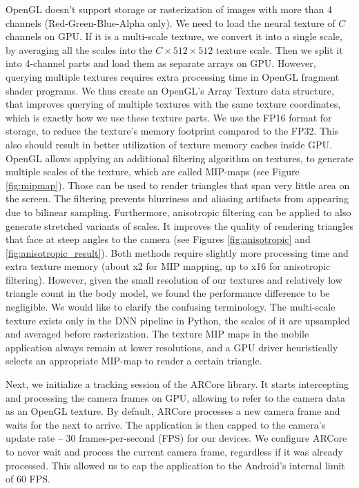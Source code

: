 OpenGL doesn't support storage or rasterization of images with more than 4 channels (Red-Green-Blue-Alpha only). We need to load the neural texture of $C$ channels on GPU. If it is a multi-scale texture, we convert it into a single scale, by averaging all the scales into the $C \times 512 \times 512$ texture scale. Then we split it into 4-channel parts and load them as separate arrays on GPU. However, querying multiple textures requires extra processing time in OpenGL fragment shader programs. We thus create an OpenGL's Array Texture data structure, that improves querying of multiple textures with the same texture coordinates, which is exactly how we use these texture parts. We use the FP16 format for storage, to reduce the texture's memory footprint compared to the FP32. This also should result in better utilization of texture memory caches inside GPU. OpenGL allows applying an additional filtering algorithm on textures, to generate multiple scales of the texture, which are called MIP-maps (see Figure \ref{fig:mipmap}). Those can be used to render triangles that span very little area on the screen. The filtering prevents blurriness and aliasing artifacts from appearing due to bilinear sampling. Furthermore, anisotropic filtering can be applied to also generate stretched variants of scales. It improves the quality of rendering triangles that face at steep angles to the camera (see Figures \ref{fig:anisotropic} and \ref{fig:anisotropic_result}). Both methods require slightly more processing time and extra texture memory (about x2 for MIP mapping, up to x16 for anisotropic filtering). However, given the small resolution of our textures and relatively low triangle count in the body model, we found the performance difference to be negligible. We would like to clarify the confusing terminology. The multi-scale texture exists only in the DNN pipeline in Python, the scales of it are upsampled and averaged before rasterization. The texture  MIP maps in the mobile application always remain at lower resolutions, and a GPU driver heuristically selects an appropriate MIP-map to render a certain triangle.

Next, we initialize a tracking session of the ARCore library. It starts intercepting and processing the camera frames on GPU, allowing to refer to the camera data as an OpenGL texture. By default, ARCore processes a new camera frame and waits for the next to arrive. The application is then capped to the camera's update rate -- 30 frames-per-second (FPS) for our devices. We configure ARCore to never wait and process the current camera frame, regardless if it was already processed. This allowed us to cap the application to the Android's internal limit of 60 FPS.

